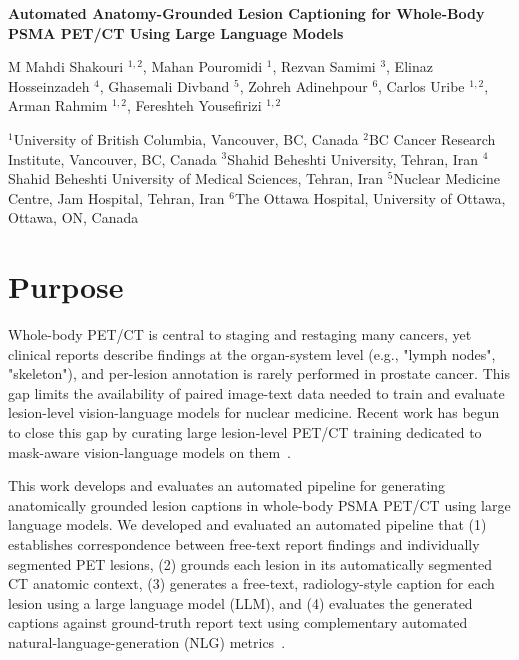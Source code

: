 \documentclass[10pt]{article}
\begin{document}
\begin{center}
{\Large \bfseries Automated Anatomy-Grounded Lesion Captioning for Whole-Body \\ PSMA PET/CT Using Large Language Models}

\vspace{6pt}
{\normalsize M Mahdi Shakouri $^{1,2}$, Mahan Pouromidi $^{1}$, Rezvan Samimi $^{3}$, Elinaz Hosseinzadeh $^{4}$, Ghasemali Divband $^{5}$, Zohreh Adinehpour $^{6}$, Carlos Uribe $^{1,2}$, Arman Rahmim $^{1,2}$, Fereshteh Yousefirizi $^{1,2}$}


\vspace{2pt}
{\small $^{1}$University of British Columbia, Vancouver, BC, Canada \quad
$^{2}$BC Cancer Research Institute, Vancouver, BC, Canada \quad
$^{3}$Shahid Beheshti University, Tehran, Iran \quad
$^{4}$Shahid Beheshti University of Medical Sciences, Tehran, Iran \quad
$^{5}$Nuclear Medicine Centre, Jam Hospital, Tehran, Iran \quad
$^{6}$The Ottawa Hospital, University of Ottawa, Ottawa, ON, Canada
}
\end{center}


\vspace{4pt}
\section*{Purpose}
Whole-body PET/CT is central to staging and restaging many cancers, yet clinical reports describe findings at the organ-system level (e.g., "lymph nodes", "skeleton"), and per-lesion annotation is rarely performed in prostate cancer. This gap limits the availability of paired image-text data needed to train and evaluate lesion-level vision-language models for nuclear medicine. Recent work has begun to close this gap by curating large lesion-level PET/CT training dedicated to mask-aware vision-language models on them~\cite{ref:petar}.



This work develops and evaluates an automated pipeline for generating anatomically grounded lesion captions in whole-body PSMA PET/CT using large language models. We developed and evaluated an automated pipeline that (1) establishes correspondence between free-text report findings and individually segmented PET lesions, (2) grounds each lesion in its automatically segmented CT anatomic context, (3) generates a free-text, radiology-style caption for each lesion using a large language model (LLM), and (4) evaluates the generated captions against ground-truth report text using complementary automated natural-language-generation (NLG) metrics~\cite{ref:bert,ref:bartscore,ref:rab}.
\end{document}

